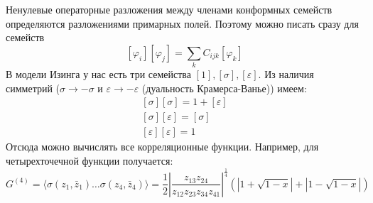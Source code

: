 \documentclass[a4paper,12pt]{article}
\theoremstyle{definition}
\theoremstyle{definition}
\theoremstyle{definition}
\begin{document}
Ненулевые операторные разложения между членами конформных семейств определяются разложениями примарных полей. Поэтому можно писать сразу для семейств
\begin{equation}
  \label{eq:300}
  [\varphi_i][\varphi_j]=\sum_k C_{ijk} [\varphi_k]
\end{equation}
В модели Изинга у нас есть три семейства $[1], [\sigma], [\varepsilon]$. Из наличия симметрий ($\sigma\to - \sigma$ и $\varepsilon\to -\varepsilon$ (дуальность Крамерса-Ванье)) имеем:
\begin{eqnarray}
  \label{eq:301}
  \left[\sigma\right]\left[\sigma\right]=1+\left[\varepsilon\right]\\
  \left[\sigma\right]\left[\varepsilon\right]=\left[\sigma\right]\\
  \left[\varepsilon\right]\left[\varepsilon\right]=1
\end{eqnarray}
Отсюда можно вычислять все корреляционные функции. Например, для четырехточечной функции получается:
\begin{equation}
  \label{eq:302}
  G^{(4)} =\langle \sigma(z_1,\bar z_1)\dots \sigma(z_4,\bar z_4)\rangle = \frac{1}{2} \left|\frac{z_{13}z_{24}}{z_{12} z_{23}z_{34}z_{41}}\right|^{\frac{1}{4}}\left(\left|1+\sqrt{1-x}\right| + \left|1-\sqrt{1-x}\right|\right)
\end{equation}

{}

\end{document}
